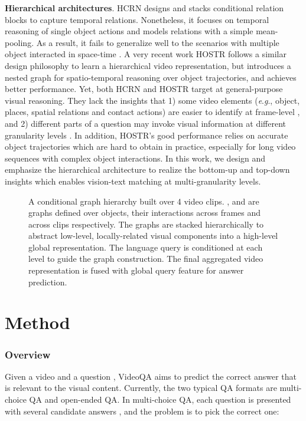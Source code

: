 \documentclass[letterpaper]{article} \usepackage{aaai21}  \usepackage{times}  \usepackage{helvet} \usepackage{courier}  \usepackage[hyphens]{url}  \usepackage{graphicx} \urlstyle{rm} \def\UrlFont{\rm}  \usepackage{natbib}  \usepackage{caption} \usepackage{color, colortbl}
\newcommand{\eg}{\textit{e}.\textit{g}.}
\begin{document}
\textbf{Hierarchical architectures}. HCRN \cite{le2020hierarchical} designs and stacks conditional relation blocks to capture temporal relations. Nonetheless, it focuses on temporal reasoning of single object actions and models relations with a simple mean-pooling. As a result, it fails to generalize well to the scenarios with multiple object interacted in space-time \cite{xiao2021next}. A very recent work HOSTR \cite{dang2021hierarchical} follows a similar design philosophy to learn a hierarchical video representation, but introduces a nested graph for spatio-temporal reasoning over object trajectories, and achieves better performance. Yet, both HCRN and HOSTR
target at general-purpose visual reasoning. They lack the insights that 1) some video elements (\eg, object, places, spatial relations and contact actions) are easier to identify at frame-level \cite{gkioxari2018detecting,xiao2020visual}, and 2) different parts of a question may invoke visual information at different granularity levels \cite{chen2020fine}. In addition, HOSTR's good performance relies on accurate object trajectories which are hard to obtain in practice, especially for long video sequences with complex object interactions. In this work, we design and emphasize the hierarchical architecture to realize the bottom-up and top-down insights which enables vision-text matching at multi-granularity levels.
\begin{figure*}[t]
 \centering
 \caption{A conditional graph hierarchy built over 4 video clips. ,  and  are graphs defined over objects, their interactions across frames and across clips respectively. The graphs are stacked hierarchically to abstract low-level, locally-related visual components into a high-level global representation. The language query  is conditioned at each level to guide the graph construction. The final aggregated video representation is fused with global query feature  for answer prediction.}

 \label{fig:model_arc}
 \vspace{-1.0em}
\end{figure*}

\section{Method}
\subsubsection{Overview}
Given a video  and a question , VideoQA aims to predict the correct answer  that is relevant to the visual content. Currently, the two typical QA formats are multi-choice QA and open-ended QA. In multi-choice QA, each question is presented with several candidate answers , and the problem is to pick the correct one:
\end{document}
